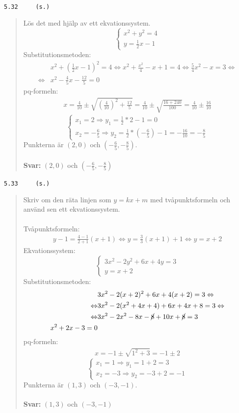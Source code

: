 \documentclass[a4paper]{article}
\newcommand{\tskcol}[1]{\textcolor{tskcol}{#1}}
\begin{document}
	\pagebreak
	\texttt{\tskcol{5.32~~~~ (s.)}}
	\begin{quotation}
		\noindent
		Lös det med hjälp av ett ekvationssystem.
		\[\begin{cases}
		x^2+y^2=4 \\
		y=\frac{1}{2}x-1
		\end{cases}\]
		Substitutionsmetoden:
		\begin{align*}
		&x^2+(\tfrac{1}{2}x-1)^2=4 \Leftrightarrow
		x^2+\frac{x^2}{4}-x+1=4 \Leftrightarrow
		\frac{5}{4}x^2-x=3 \Leftrightarrow \\ \Leftrightarrow
		&x^2-\frac{4}{5}x-\frac{12}{5}=0
		\end{align*}
		pq-formeln:
		\begin{align*}
		x=\frac{4}{10}\pm\sqrt{\left(\frac{4}{10}\right)^2+\frac{12}{5}}=
		\frac{4}{10}\pm\sqrt{\frac{16+240}{100}}=
		\frac{4}{10}\pm\frac{16}{10}
		\end{align*}
		\[\begin{cases}
		x_1=2 \Rightarrow y_1=\frac{1}{2}*2-1=0 \\
		x_2=-\frac{6}{5} \Rightarrow y_2=\frac{1}{2}*(-\frac{6}{5})-1=-\frac{16}{10}=-\frac{8}{5}
		\end{cases}\]
		Punkterna är $(2,0)$ och $(-\frac{6}{5},-\frac{8}{5})$.
		\\ \\
		\textbf{Svar:} $(2,0)$ och $(-\frac{6}{5},-\frac{8}{5})$
	\end{quotation}
	
	\texttt{\tskcol{5.33~~~~ (s.)}}
	\begin{quotation}
		\noindent
		Skriv om den räta linjen som $y=kx+m$ med tvåpunktsformeln och använd sen ett ekvationssystem.
		\\ \\
		Tvåpunktsformeln:
		\begin{align*}
		y-1=\frac{4-1}{2+1}(x+1) \Leftrightarrow
		y=\frac{3}{3}(x+1)+1 \Leftrightarrow
		y=x+2
		\end{align*}
		Ekvationssystem:
		\[\begin{cases}
		3x^2-2y^2+6x+4y=3 \\
		y=x+2
		\end{cases}\]
		Substitutionsmetoden:
		\begin{align*}
		&3x^2-2(x+2)^2+6x+4(x+2)=3 \Leftrightarrow \\ \Leftrightarrow
		&3x^2-2(x^2+4x+4)+6x+4x+8=3 \Leftrightarrow \\ \Leftrightarrow
		&3x^2-2x^2-8x-\cancel{8}+10x+\cancel{8}=3 \\
		x^2+2x-3=0
		\end{align*}
		pq-formeln:
		\begin{align*}
		x=-1\pm\sqrt{1^2+3}=
		-1\pm2
		\end{align*}
		\[\begin{cases}
		x_1=1 \Rightarrow y_1=1+2=3 \\
		x_2=-3 \Rightarrow y_2=-3+2=-1
		\end{cases}\]
		Punkterna är $(1,3)$ och $(-3,-1)$.
		\\ \\
		\textbf{Svar:} $(1,3)$ och $(-3,-1)$
	\end{quotation}
	
	
\end{document}
